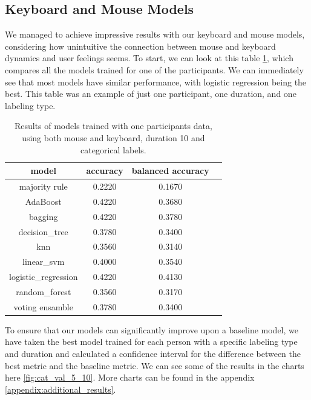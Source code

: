 \documentclass[../main.tex]{subfiles}
\begin{document}
    \subsection{Keyboard and Mouse Models}

    We managed to achieve impressive results with our keyboard and mouse models, considering how unintuitive the connection between
    mouse and keyboard dynamics and user feelings seems. To start, we can look at this table \ref{table:shoham_models}, 
    which compares all the models trained for one of the participants. We can immediately see that most models have similar performance, 
    with logistic regression being the best. This table was an example of just one participant, one duration, and one labeling type. 

    \begin{table}[htp]
        \centering
        \begin{center}
            \begin{tabular}{cccc}
                \toprule
                model &  accuracy & balanced accuracy & \\
                \midrule
                    majority rule           & 0.2220 & 0.1670 & \\
                    AdaBoost                & 0.4220 & 0.3680 & \\
                    bagging                 & 0.4220 & 0.3780 & \\
                    decision\_tree          & 0.3780 & 0.3400 & \\
                    knn                     & 0.3560 & 0.3140 & \\
                    linear\_svm             & 0.4000 & 0.3540 & \\
                    logistic\_regression    & 0.4220 & 0.4130 & \\
                    random\_forest          & 0.3560 & 0.3170 & \\
                    voting ensamble         & 0.3780 & 0.3400 & \\
                \bottomrule
            \end{tabular}
        \end{center}
        \caption{Results of models trained with one participants data, using both mouse and keyboard, duration 10 and categorical labels.}
        \label{table:shoham_models}
    \end{table}


    To ensure that our models can significantly improve upon a baseline model, 
    we have taken the best model trained for each person with a specific labeling type and duration and calculated a confidence interval 
    for the difference between the best metric and the baseline metric. We can see some of the results in the charts here \ref{fig:cat_val_5_10}. 
    More charts can be found in the appendix \ref{appendix:additional_results}.
\end{document}
